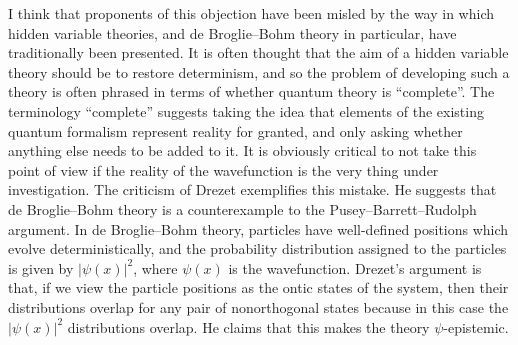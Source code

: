 \documentclass[DIV=calc,paper=a4,fontsize=11pt,twocolumn]{scrartcl} %
\theoremstyle{definition}
\theoremstyle{plain}
\begin{document}
I think that proponents of this objection have been misled by the way
in which hidden variable theories, and de Broglie--Bohm theory in
particular, have traditionally been presented.  It is often thought
that the aim of a hidden variable theory should be to restore
determinism, and so the problem of developing such a theory is often
phrased in terms of whether quantum theory is ``complete''.  The
terminology ``complete'' suggests taking the idea that elements of the
existing quantum formalism represent reality for granted, and only
asking whether anything else needs to be added to it.  It is obviously
critical to not take this point of view if the reality of the
wavefunction is the very thing under investigation.  The criticism of
Drezet \cite{Drezet2012, Drezet2012a} exemplifies this mistake.  He
suggests that de Broglie--Bohm theory is a counterexample to the Pusey--Barrett--Rudolph
argument.  In de Broglie--Bohm theory, particles have well-defined
positions which evolve deterministically, and the probability
distribution assigned to the particles is given by $|\psi(x)|^2$,
where $\psi(x)$ is the wavefunction.  Drezet's argument is that, if we
view the particle positions as the ontic states of the system, then
their distributions overlap for any pair of nonorthogonal states
because in this case the $|\psi(x)|^2$ distributions overlap.  He
claims that this makes the theory $\psi$-epistemic.
\end{document}
